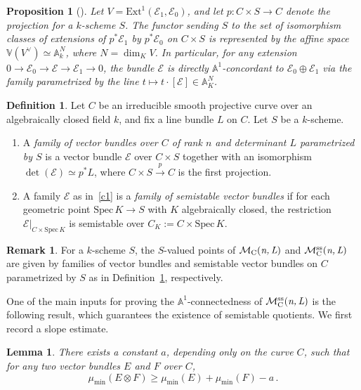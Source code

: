 \documentclass[12pt,reqno]{amsart}
\DeclareMathOperator{\mnl}{\mc{M}_C(\textit{n,\,L})}
\DeclareMathOperator{\mnlss}{\mc{M}^{ss}_C(\textit{n,\,L})}
\newcommand{\mc}[1]{\mathcal{#1}}
\newcommand{\bb}[1]{\mathbb{#1}}
\newtheorem{lemma}[theorem]{Lemma}
\newtheorem{proposition}[theorem]{Proposition}
\theoremstyle{definition}
\newtheorem{definition}[theorem]{Definition}
\newtheorem{remark}[theorem]{Remark}
\numberwithin{equation}{section}
\begin{document}
	\begin{proposition}[]
		\label{prop:concordance}
		Let $V=\mathrm{Ext}^1(\mc{E}_1,\mc{E}_0)$, and let
		$p:C\times S \rightarrow C$ denote the projection for a $k$-scheme $S$. The
		functor sending $S$ to the set of isomorphism classes of extensions of
		$p^*\mc{E}_1$ by $p^*\mc{E}_0$ on $C\times S$ is represented by the affine
		space $\bb{V}(V^{\vee})\simeq \bb{A}^N_k$, where $N=\dim_K V$. In
		particular, for any extension $0\rightarrow \mc{E}_0\rightarrow \mc{E}
		\rightarrow \mc{E}_1\rightarrow 0$, the bundle $\mc{E}$ is directly
		$\bb{A}^1$-concordant to $\mc{E}_0\oplus \mc{E}_1$ via the family
		parametrized by the line $t\mapsto t\cdot[\mc{E}]\in \bb{A}^N_K$.
	\end{proposition}
	
	\begin{definition}\label{def:family}
		Let $C$ be an irreducible smooth projective curve over an algebraically
		closed field $k$, and fix a line bundle $L$ on $C$. Let $S$ be a $k$-scheme.
		\begin{enumerate}[(1)]
			\item\label{c1} A \textit{family of vector bundles over $C$ of rank $n$ and
				determinant $L$ parametrized by $S$} is a vector bundle $\mc{E}$ over
			$C\times S$ together with an isomorphism $\det(\mc{E})\simeq p^*L$,
			where $C\times S\xrightarrow{p} C$ is the first projection.
			\item\label{c2} A family $\mc{E}$ as in~\eqref{c1} is a \textit{family of
				semistable vector bundles} if for each geometric point
			$\mathrm{Spec}\,K\rightarrow S$ with $K$ algebraically closed, the
			restriction $\mc{E}|_{C\times\mathrm{Spec}\,K}$ is semistable over
			$C_K := C\times \mathrm{Spec}\,K$.
		\end{enumerate}
	\end{definition}
	
	\begin{remark}
		For a $k$-scheme $S$, the $S$-valued points of $\mnl$ and $\mnlss$ are given
		by families of vector bundles and semistable vector bundles on $C$
		parametrized by $S$ as in Definition~\ref{def:family}, respectively.
	\end{remark}
	
	One of the main inputs for proving the $\bb{A}^1$-connectedness of $\mnlss$
	is the following result, which guarantees the existence of semistable
	quotients. We first record a slope estimate.
	
	\begin{lemma}\label{lem:mu-min}
		There exists a constant $a$, depending only on the curve $C$, such that for
		any two vector bundles $E$ and $F$ over $C$,
		\[
		\mu_{\mathrm{min}}(E\otimes F)\geq \mu_{\mathrm{min}}(E)
		+\mu_{\mathrm{min}}(F) - a\,.
		\]
	\end{lemma}
	
\end{document}
